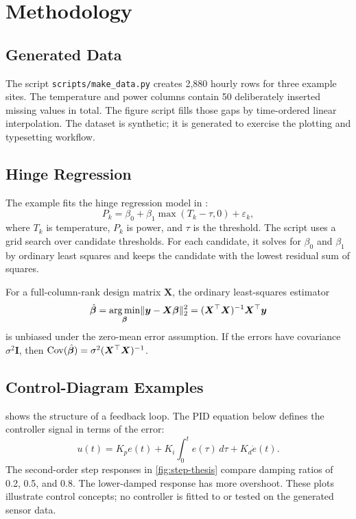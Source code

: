 \chapter{Methodology}\label{ch:method}

\section{Generated Data}
The script \texttt{scripts/make\_data.py} creates 2,880 hourly rows for three example sites. The temperature and power columns contain 50 deliberately inserted missing values in total. The figure script fills those gaps by time-ordered linear interpolation. The dataset is synthetic; it is generated to exercise the plotting and typesetting workflow.

\section{Hinge Regression}
The example fits the hinge regression model in :
\begin{equation}
  P_k=\beta_0+\beta_1\max(T_k-\tau,0)+\varepsilon_k,
  \label{eq:thesis-hinge}
\end{equation}
where $T_k$ is temperature, $P_k$ is power, and $\tau$ is the threshold. The script uses a grid search over candidate thresholds. For each candidate, it solves for $\beta_0$ and $\beta_1$ by ordinary least squares and keeps the candidate with the lowest residual sum of squares.

\begin{proposition}\label{prop:ols}
For a full-column-rank design matrix $\bm X$, the ordinary least-squares estimator
\begin{equation}
  \hat{\bm\beta}
  =\operatorname*{arg\,min}_{\bm\beta}\lVert\bm y-\bm X\bm\beta\rVert_2^2
  =(\bm X^{\top}\bm X)^{-1}\bm X^{\top}\bm y
  \label{eq:thesis-ols}
\end{equation}
is unbiased under the zero-mean error assumption. If the errors have covariance $\sigma^2\bm I$, then
$\operatorname{Cov}(\hat{\bm\beta})=\sigma^2(\bm X^{\top}\bm X)^{-1}$.
\end{proposition}

\section{Control-Diagram Examples}
 shows the structure of a feedback loop. The PID equation below defines the controller signal in terms of the error:
\begin{equation}
  u(t)=K_p e(t)+K_i\!\int_0^t e(\tau)\,d\tau+K_d\dot e(t).
\end{equation}
The second-order step responses in \cref{fig:step-thesis} compare damping ratios of 0.2, 0.5, and 0.8. The lower-damped response has more overshoot. These plots illustrate control concepts; no controller is fitted to or tested on the generated sensor data.

